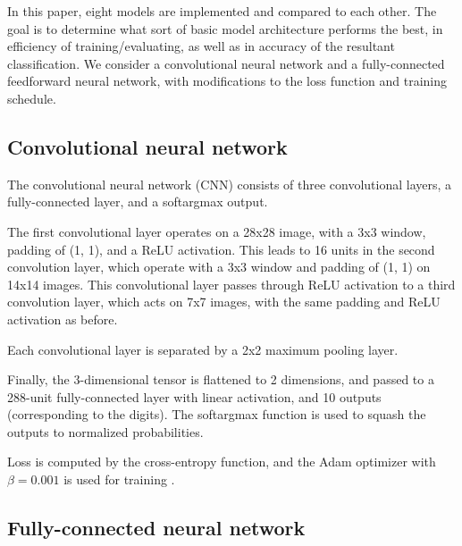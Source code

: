 \documentclass{article}
\begin{document}
In this paper, eight models are implemented and compared to each other.
The goal is to determine what sort of basic model architecture performs the best,
in efficiency of training/evaluating, as well as in accuracy of the resultant classification.
We consider a convolutional neural network and a fully-connected feedforward neural network,
with modifications to the loss function and training schedule.

\subsection{Convolutional neural network}

The convolutional neural network (CNN) consists of three convolutional layers,
a fully-connected layer, and a softargmax output.

The first convolutional layer operates on a 28x28 image, with a 3x3 window,
padding of (1, 1), and a ReLU activation.
This leads to 16 units in the second convolution layer,
which operate with a 3x3 window and padding of (1, 1) on 14x14 images.
This convolutional layer passes through ReLU activation to a third convolution layer,
which acts on 7x7 images, with the same padding and ReLU activation as before.

Each convolutional layer is separated by a 2x2 maximum pooling layer.

Finally, the 3-dimensional tensor is flattened to 2 dimensions,
and passed to a 288-unit fully-connected layer with linear activation,
and 10 outputs (corresponding to the digits).
The softargmax function is used to squash the outputs to normalized probabilities.

Loss is computed by the cross-entropy function, and the Adam optimizer with $\beta = 0.001$
is used for training \citep{kingmaAdamMethodStochastic2017}.


\subsection{Fully-connected neural network}
\end{document}
